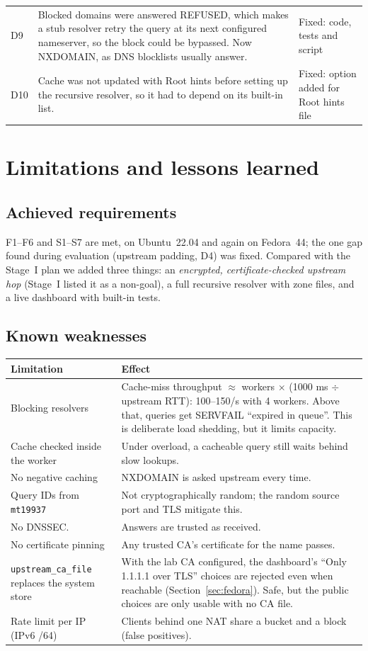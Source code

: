 \documentclass[11pt,a4paper]{article}
\newcommand{\code}[1]{\texttt{#1}}
\begin{document}
\begin{tabularx}{\textwidth}{@{}lLP{2.4cm}@{}}
D9 & Blocked domains were answered REFUSED, which makes a stub resolver retry the query at its next configured nameserver, so the block could be bypassed. Now NXDOMAIN, as DNS blocklists usually answer. & Fixed: code, tests and script \\
D10 & Cache was not updated with Root hints before setting up the recursive resolver, so it had to depend on its built-in list. & Fixed: option added for Root hints file \\
\bottomrule
\end{tabularx}

\section{Limitations and lessons learned}\label{sec:limits}

\subsection{Achieved requirements}
F1--F6 and S1--S7 are met, on Ubuntu~22.04 and again on Fedora~44; the one gap found during evaluation (upstream padding, D4) was fixed. Compared with the Stage~I plan we
added three things: an \emph{encrypted, certificate-checked upstream hop} (Stage~I listed it as a
non-goal), a full recursive resolver with zone files, and a live dashboard with built-in tests.

\subsection{Known weaknesses}
\begin{tabularx}{\textwidth}{@{}P{4.6cm}L@{}}
\toprule
Limitation & Effect \\
\midrule
Blocking resolvers & Cache-miss throughput $\approx$ workers $\times$ (1000 ms $\div$ upstream RTT): 100--150/s with 4 workers. Above that, queries get SERVFAIL ``expired in queue''. This is deliberate load shedding, but it limits capacity. \\
Cache checked inside the worker & Under overload, a cacheable query still waits behind slow lookups. \\
No negative caching & NXDOMAIN is asked upstream every time. \\
Query IDs from \code{mt19937} & Not cryptographically random; the random source port and TLS mitigate this. \\
No DNSSEC. & Answers are trusted as received. \\
No certificate pinning & Any trusted CA's certificate for the name passes. \\
\code{upstream\_ca\_file} replaces the system store & With the lab CA configured, the dashboard's ``Only 1.1.1.1 over TLS'' choices are rejected even when reachable (Section~\ref{sec:fedora}). Safe, but the public choices are only usable with no CA file. \\
Rate limit per IP (IPv6 /64) & Clients behind one NAT share a bucket and a block (false positives). \\
\bottomrule
\end{tabularx}
\end{document}
